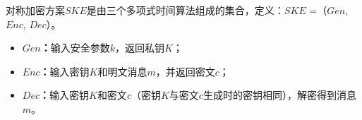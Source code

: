 



\begin{defn}[对称加密方案]
\label{defn:random_oracle}
对称加密方案$SKE$是由三个多项式时间算法组成的集合，定义：$SKE$ =（$Gen$, $Enc$, $Dec$）。
\begin{itemize}
  \item
  \textbf{$Gen$：}输入安全参数$k$，返回私钥$K$；

  \item
  \textbf{$Enc$：}输入密钥$K$和明文消息$m$，并返回密文$c$；

  \item
  \textbf{$Dec$：}输入密钥$K$和密文$c$（密钥$K$与密文$c$生成时的密钥相同），解密得到消息$m$。

\end{itemize}
\end{defn}

